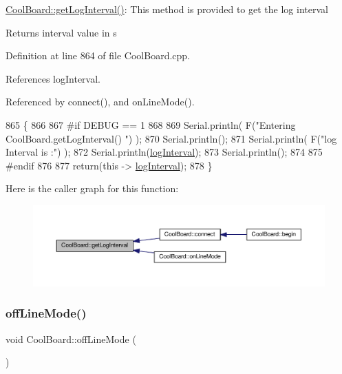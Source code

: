 \hyperlink{classCoolBoard_a7508e029f2ee17bb747ffab599285e0d}{Cool\+Board\+::get\+Log\+Interval()}\+: This method is provided to get the log interval

\begin{DoxyReturn}{Returns}
interval value in s 
\end{DoxyReturn}


Definition at line 864 of file Cool\+Board.\+cpp.



References log\+Interval.



Referenced by connect(), and on\+Line\+Mode().


\begin{DoxyCode}
865 \{
866 
867 \textcolor{preprocessor}{#if DEBUG == 1}
868 
869     Serial.println( F(\textcolor{stringliteral}{"Entering CoolBoard.getLogInterval() "}) );
870     Serial.println();
871     Serial.println( F(\textcolor{stringliteral}{"log Interval is :"}) );
872     Serial.println(\hyperlink{classCoolBoard_a84bc94413b64973e4aba8c467c97006c}{logInterval});
873     Serial.println();
874 
875 \textcolor{preprocessor}{#endif}
876 
877     \textcolor{keywordflow}{return}(\textcolor{keyword}{this} -> \hyperlink{classCoolBoard_a84bc94413b64973e4aba8c467c97006c}{logInterval});
878 \}
\end{DoxyCode}
Here is the caller graph for this function\+:\nopagebreak
\begin{figure}[H]
\begin{center}
\leavevmode
\includegraphics[width=350pt]{classCoolBoard_a7508e029f2ee17bb747ffab599285e0d_icgraph}
\end{center}
\end{figure}
\mbox{\label{classCoolBoard_ae6b5e1274d760462290192acea4adca8}} 
\subsubsection{\texorpdfstring{off\+Line\+Mode()}{offLineMode()}}
{\footnotesize\ttfamily void Cool\+Board\+::off\+Line\+Mode (\begin{DoxyParamCaption}{ }\end{DoxyParamCaption})}

